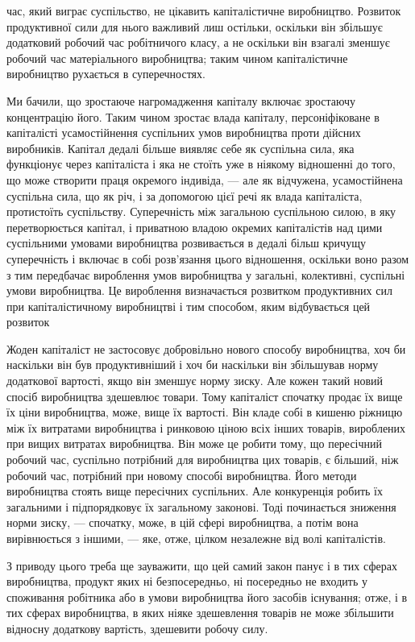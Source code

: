 \parcont{}  %
час, який виграє суспільство, не цікавить капіталістичне виробництво.
Розвиток продуктивної сили для нього важливий лиш
остільки, оскільки він збільшує додатковий робочий час робітничого
класу, а не оскільки він взагалі зменшує робочий час
матеріального виробництва; таким чином капіталістичне виробництво
рухається в суперечностях.

Ми бачили, що зростаюче нагромадження капіталу включає
зростаючу концентрацію його. Таким чином зростає влада капіталу,
персоніфіковане в капіталісті усамостійнення суспільних
умов виробництва проти дійсних виробників. Капітал дедалі більше
виявляє себе як суспільна сила, яка функціонує через капіталіста
і яка не стоїть уже в ніякому відношенні до того, що
може створити праця окремого індивіда, — але як відчужена,
усамостійнена суспільна сила, що як річ, і за допомогою цієї
речі як влада капіталіста, протистоїть суспільству. Суперечність
між загальною суспільною силою, в яку перетворюється капітал,
і приватною владою окремих капіталістів над цими суспільними
умовами виробництва розвивається в дедалі більш кричущу суперечність
і включає в собі розв’язання цього відношення,
оскільки воно разом з тим передбачає вироблення умов виробництва
у загальні, колективні, суспільні умови виробництва.
Це вироблення визначається розвитком продуктивних сил при
капіталістичному виробництві і тим способом, яким відбувається
цей розвиток

Жоден капіталіст не застосовує добровільно нового способу
виробництва, хоч би наскільки він був продуктивніший і хоч би
наскільки він збільшував норму додаткової вартості, якщо він
зменшує норму зиску. Але кожен такий новий спосіб виробництва
здешевлює товари. Тому капіталіст спочатку продає
їх вище їх ціни виробництва, може, вище їх вартості. Він кладе
собі в кишеню ріжницю між їх витратами виробництва і ринковою
ціною всіх інших товарів, вироблених при вищих витратах
виробництва. Він може це робити тому, що пересічний робочий
час, суспільно потрібний для виробництва цих товарів, є більший,
ніж робочий час, потрібний при новому способі виробництва.
Його методи виробництва стоять вище пересічних суспільних.
Але конкуренція робить їх загальними і підпорядковує їх загальному
законові. Тоді починається зниження норми зиску, — спочатку,
може, в цій сфері виробництва, а потім вона вирівнюється
з іншими, — яке, отже, цілком незалежне від волі капіталістів.

З приводу цього треба ще зауважити, що цей самий закон
панує і в тих сферах виробництва, продукт яких ні безпосередньо,
ні посередньо не входить у споживання робітника або
в умови виробництва його засобів існування; отже, і в тих сферах
виробництва, в яких ніяке здешевлення товарів не може збільшити
відносну додаткову вартість, здешевити робочу силу.
\parbreak{}  %
